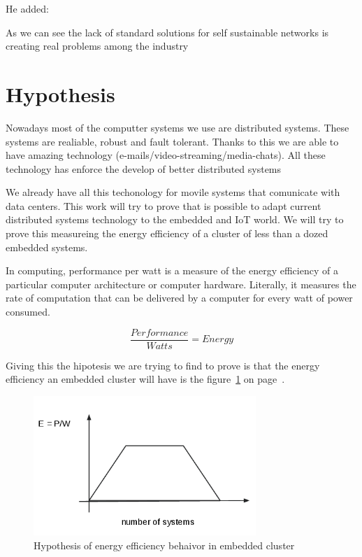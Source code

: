 He added: 


As we can see the lack of standard solutions for self sustainable networks is 
creating real problems among the industry


\section{Hypothesis}
\noindent

Nowadays most of the computter systems we use are distributed systems. These
systems are realiable, robust and fault tolerant. Thanks to this we are able to
have amazing technology (e-mails/video-streaming/media-chats). All these
technology has enforce the develop of better distributed systems

We already have all this techonology for movile systems that comunicate with
data centers. This work will try to prove that is possible to adapt current
distributed systems technology to the embedded and IoT world. We will try to
prove this measureing the energy efficiency of a cluster of less than a dozed 
embedded systems. 

In computing, performance per watt is a measure of the energy efficiency of a
particular computer architecture or computer hardware. Literally, it measures
the rate of computation that can be delivered by a computer for every watt of
power consumed. 



\begin{equation}
    \dfrac {Performance}{Watts} = Energy
\end{equation}

Giving this the hipotesis we are trying to find to prove is that the energy
efficiency an embedded cluster will have is the 
figure~\ref{fig:1.2} on page~\pageref{fig:1.2}.


\begin{figure}[H]
\centering
\includegraphics[width=0.75\textwidth]{images/graph_1.png}
\caption{Hypothesis of energy efficiency behaivor in embedded cluster}
\label{fig:1.2}
\end{figure}

